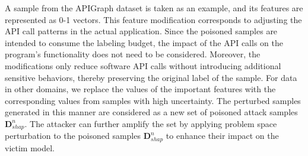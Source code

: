 A sample from the APIGraph dataset is taken as an example, and its features are represented as 0-1 vectors.
This feature modification corresponds to adjusting the API call patterns in the actual application.
Since the poisoned samples are intended to consume the labeling budget, the impact of the API calls on the program's functionality does not need to be considered.
Moreover, the modifications only reduce software API calls without introducing additional sensitive behaviors, thereby preserving the original label of the sample.
For data in other domains, we replace the values of the important features with the corresponding values from samples with high uncertainty.
The perturbed samples generated in this manner are considered as a new set of poisoned attack samples $\bm{D}_{shap}^{n}$.
The attacker can further amplify the set by applying problem space perturbation to the poisoned samples $\bm{D}_{shap}^{n}$ to enhance their impact on the victim model.

